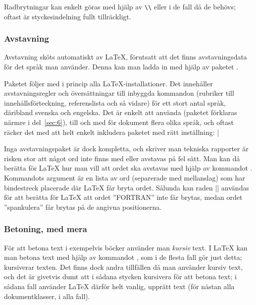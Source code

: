 \documentclass[../../latex.tex]{subfiles}
\begin{document}
Radbrytningar kan enkelt göras med hjälp av \verb|\\| eller 
i de fall då de behövs; oftast är styckesindelning fullt tillräckligt.

\subsubsection{Avstavning}
Avstavning sköts automatiskt av \LaTeX{}, förutsatt att det finns
avstavningsdata för det språk man använder. Denna kan man ladda in med
hjälp av paketet .

Paketet  följer med i princip alla \LaTeX-installationer. 
Det innehåller avstavningsregler
och översättningar till inbyggda kommandon (rubriker till
innehållsförteckning, referenslista och så vidare) för ett stort antal
språk, däribland svenska och engelska. Det är enkelt att använda
 (paketet förklaras närmre i del~\ref{sec:6}), till och med
för dokument flera olika språk, och oftast räcker det med att helt
enkelt inkludera paketet med rätt inställning:
\latex|\usepackage[swedish]{babel} %

Inga avstavningspaket är dock kompletta, och skriver man tekniska 
rapporter är risken stor att något ord inte finns med eller avstavas på
fel sätt. Man kan då berätta för \LaTeX{} hur man vill att ordet ska
avstavas med hjälp av kommandot . Kommandots argument är
en lista av ord (separerade med mellanslag) som har bindestreck
placerade där \LaTeX{} får bryta ordet. Sålunda kan raden
\latex||
användas för att berätta för \LaTeX{} att ordet ”\textsc{FORTRAN}” inte 
får brytas, medan ordet ”spankulera” får brytas på de angivna 
positionerna.

\subsubsection{Betoning, med mera}
För att betona text i exempelvis böcker använder man \emph{kursiv} text. I
\LaTeX{} kan man betona text med hjälp av kommandot , som i de
flesta fall gör just detta; kursiverar texten. Det finns dock andra
tillfällen då man använder kursiv text, och det är givetvis dumt att i
sådana stycken kursivera för att betona text; i sådana fall använder
\LaTeX{} därför helt vanlig, upprätt text (för nästan alla 
dokumentklasser, i alla fall).
\end{document}
